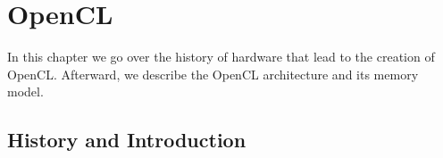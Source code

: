 
\chapter{OpenCL} %

\label{Chapter4} %
In this chapter we go over the history of hardware that lead to the creation of OpenCL. Afterward, we describe the OpenCL architecture and its memory model.

\section{History and Introduction}

